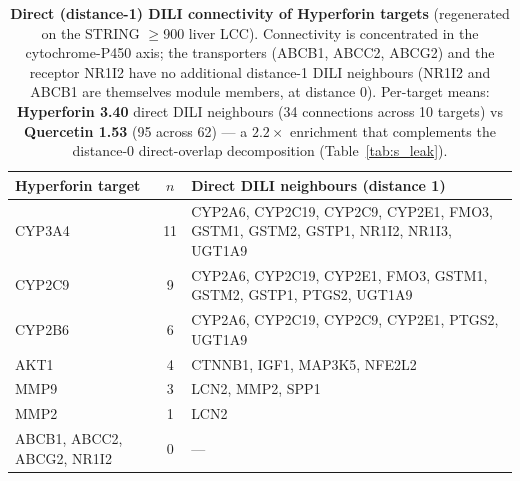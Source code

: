 \begin{table}[ht]
\centering
\caption{\textbf{Direct (distance-1) DILI connectivity of Hyperforin targets} (regenerated on the STRING $\geq$900 liver LCC). Connectivity is concentrated in the cytochrome-P450 axis; the transporters (ABCB1, ABCC2, ABCG2) and the receptor NR1I2 have no additional distance-1 DILI neighbours (NR1I2 and ABCB1 are themselves module members, at distance 0). Per-target means: \textbf{Hyperforin 3.40} direct DILI neighbours (34 connections across 10 targets) vs \textbf{Quercetin 1.53} (95 across 62) --- a $2.2\times$ enrichment that complements the distance-0 direct-overlap decomposition (Table~\ref{tab:s_leak}).}
\label{tab:s_connectivity}
\footnotesize
\begin{tabular}{@{}lcp{9.4cm}@{}}
\toprule
\textbf{Hyperforin target} & \textbf{$n$} & \textbf{Direct DILI neighbours (distance 1)} \\
\midrule
CYP3A4 & 11 & CYP2A6, CYP2C19, CYP2C9, CYP2E1, FMO3, GSTM1, GSTM2, GSTP1, NR1I2, NR1I3, UGT1A9 \\
CYP2C9 & 9  & CYP2A6, CYP2C19, CYP2E1, FMO3, GSTM1, GSTM2, GSTP1, PTGS2, UGT1A9 \\
CYP2B6 & 6  & CYP2A6, CYP2C19, CYP2C9, CYP2E1, PTGS2, UGT1A9 \\
AKT1   & 4  & CTNNB1, IGF1, MAP3K5, NFE2L2 \\
MMP9   & 3  & LCN2, MMP2, SPP1 \\
MMP2   & 1  & LCN2 \\
ABCB1, ABCC2, ABCG2, NR1I2 & 0 & --- \\
\bottomrule
\end{tabular}
\end{table}

